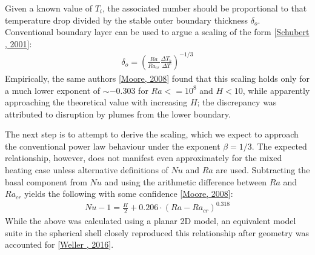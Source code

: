 \documentclass[letterpaper,10pt,english]{jupyterBook}
\begin{document}
\sphinxAtStartPar
Given a known value of \(T_i\), the associated  number should be proportional to that temperature drop divided by the stable outer boundary thickness \({\delta}_o\). Conventional boundary layer can be used to argue a scaling of the form {[}\hyperlink{cite.references:id663}{Schubert , 2001}{]}:
\begin{equation*}
\begin{split}
{\delta}_o = {\left( \frac{Ra}{{Ra}_{cr}} \frac{\Delta T_b}{\Delta T} \right)}^{-1/3}
\end{split}
\end{equation*}
\sphinxAtStartPar
Empirically, the same authors {[}\hyperlink{cite.references:id667}{Moore, 2008}{]} found that this scaling holds only for a much lower exponent of \(\sim -0.303\) for \(Ra<=10^8\) and \(H<10\), while apparently approaching the theoretical value with increasing \(H\); the discrepancy was attributed to disruption by plumes from the lower boundary.

\sphinxAtStartPar
The next step is to attempt to derive the \sphinxhyphen{} scaling, which we expect to approach the conventional power law behaviour under the  exponent \(\beta = 1/3\). The expected relationship, however, does not manifest even approximately for the mixed heating case unless alternative definitions of \(Nu\) and \(Ra\) are used. Subtracting the basal component from \(Nu\) and using the arithmetic difference between \(Ra\) and \({Ra}_{cr}\) yields the following with some confidence {[}\hyperlink{cite.references:id667}{Moore, 2008}{]}:
\begin{equation*}
\begin{split}
Nu - 1 = \frac{H}{2} + 0.206 \cdot {\left( Ra - {Ra}_{cr} \right)}^{0.318}
\end{split}
\end{equation*}
\sphinxAtStartPar
While the above was calculated using a planar 2D model, an equivalent model suite in the spherical shell closely reproduced this relationship after geometry was accounted for {[}\hyperlink{cite.references:id758}{Weller , 2016}{]}.
\end{document}
